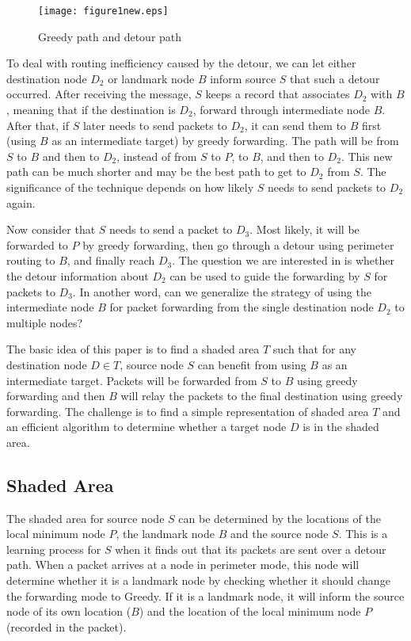 \documentclass[3p,times]{elsarticle}
\begin{document}
\begin{figure}[hbt]
\centering
\texttt{[image: figure1new.eps]}
\caption{Greedy path and detour path}
\label{fig1}
\end{figure}


To deal with routing inefficiency caused by the detour,
we can let either destination node $D_2$ or landmark node $B$ inform source $S$
that such a detour occurred.
After receiving the message, $S$ keeps a record that associates $D_2$ with $B$,
meaning that if
the destination is $D_2$, forward through intermediate node $B$.
After that, if $S$ later needs to send packets to $D_2$, it
can send them to $B$ first (using $B$ as an intermediate target) by greedy forwarding.
The path will be from $S$ to $B$ and then to $D_2$, instead of from $S$ to $P$, to $B$, and
then to $D_2$. This new path can be much shorter and may be the best path to get to $D_2$ from $S$.
The significance of the technique depends on how likely $S$ needs to send packets to $D_2$ again.

Now consider that $S$ needs to send a packet to $D_3$. Most likely, it will be forwarded to $P$
by greedy forwarding,
then go through a detour using perimeter routing to $B$, and finally reach $D_3$.
The question we are interested in is whether the detour information about $D_2$ can be used to guide
the forwarding by $S$ for packets to $D_3$. In another word, can we generalize the strategy of
using the intermediate node $B$ for packet forwarding from the single
destination node $D_2$ to multiple nodes?

The basic idea of this paper is to find a shaded area $T$ such that for any destination node $D \in T$,
source node $S$ can benefit from using $B$ as an intermediate target. Packets will be forwarded from $S$
to $B$ using greedy forwarding and then $B$ will relay the packets to the final destination
using greedy forwarding. The challenge is to find a simple representation of
shaded area $T$ and an efficient algorithm to determine whether a target node $D$ is
in the shaded area.





\subsection{Shaded Area}



The shaded area for source node $S$ can be determined by the
locations of
the local minimum node $P$, the landmark node $B$ and the source node $S$.
This is a learning process for $S$  when it finds out that its packets are
sent over a detour path.
When a packet arrives at a node in perimeter mode, this node will determine whether it is a landmark node
by checking whether it should change the forwarding mode to Greedy. If it is a landmark node, it will inform
the source node of its own location ($B$) and the location of the local minimum node $P$ (recorded in
the packet).
\end{document}
